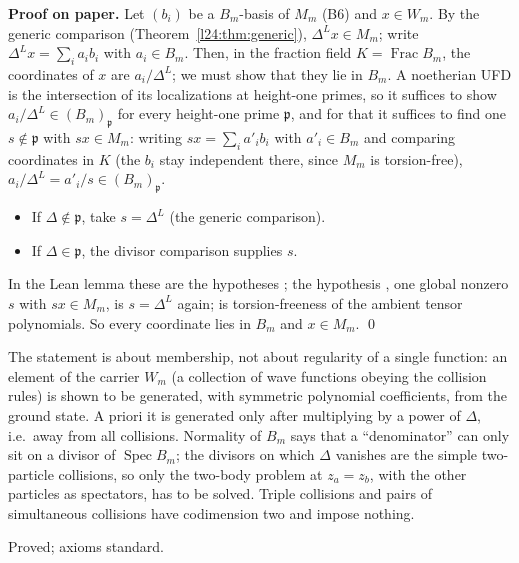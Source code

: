\textbf{Proof on paper.} Let $(b_i)$ be a $B_m$-basis of $M_m$ (B6) and $x\in W_m$. By the generic comparison
(Theorem~\ref{l24:thm:generic}), $\Delta^Lx\in M_m$; write $\Delta^Lx=\sum_ia_ib_i$ with $a_i\in B_m$. Then, in the fraction
field $K=\operatorname{Frac}B_m$, the coordinates of $x$ are $a_i/\Delta^L$; we must show that they lie in $B_m$. A noetherian
UFD is the intersection of its localizations at height-one primes, so it suffices to show $a_i/\Delta^L\in(B_m)_{\mathfrak p}$
for every height-one prime $\mathfrak p$, and for that it suffices to find one $s\notin\mathfrak p$ with $sx\in M_m$: writing
$sx=\sum_ia'_ib_i$ with $a'_i\in B_m$ and comparing coordinates in $K$ (the $b_i$ stay independent there, since $M_m$ is
torsion-free), $a_i/\Delta^L=a'_i/s\in(B_m)_{\mathfrak p}$.
\begin{itemize}
\item If $\Delta\notin\mathfrak p$, take $s=\Delta^L$ (the generic comparison).
\item If $\Delta\in\mathfrak p$, the divisor comparison supplies $s$.
\end{itemize}
In the Lean lemma  these are the hypotheses ; the hypothesis , one global
nonzero $s$ with $sx\in M_m$, is $s=\Delta^L$ again;  is torsion-freeness of the ambient tensor polynomials. So
every coordinate lies in $B_m$ and $x\in M_m$. \qed

\begin{physics}
The statement is about membership, not about regularity of a single function: an element of the carrier $W_m$ (a
collection of wave functions obeying the collision rules) is shown to be generated, with symmetric polynomial
coefficients, from the ground state. A priori it is generated only after multiplying by a power of $\Delta$, i.e.\ away
from all collisions. Normality of $B_m$ says that a ``denominator'' can only sit on a divisor of $\operatorname{Spec}B_m$;
the divisors on which $\Delta$ vanishes are the simple two-particle collisions, so only the two-body problem at
$z_a=z_b$, with the other particles as spectators, has to be solved. Triple collisions and pairs of simultaneous collisions
have codimension two and impose nothing.
\end{physics}

\begin{status}
Proved; axioms standard.
\end{status}

